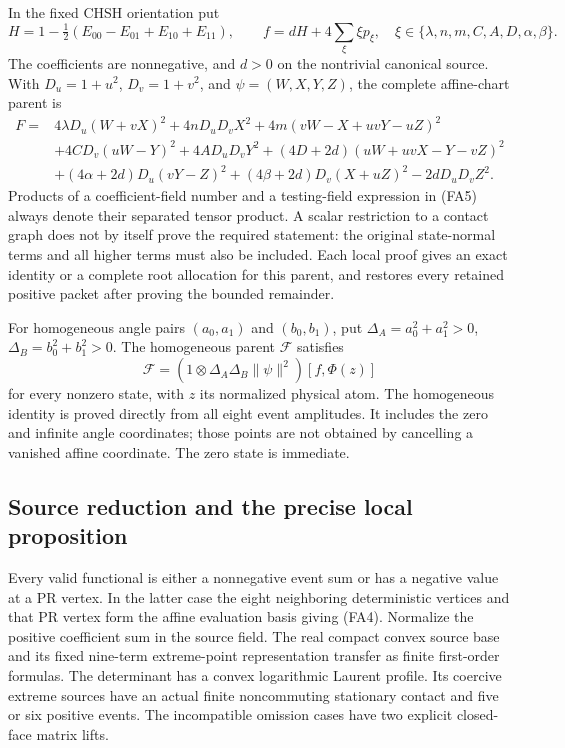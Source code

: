In the fixed CHSH orientation put
\[
 H=1-\tfrac12(E_{00}-E_{01}+E_{10}+E_{11}),\qquad
 f=dH+4\sum_{\xi}\xi p_\xi,
 \quad\xi\in\{\lambda,n,m,C,A,D,\alpha,\beta\}.                \tag{FA4}
\]
The coefficients are nonnegative, and $d>0$ on the nontrivial
canonical source.  With $D_u=1+u^2$, $D_v=1+v^2$, and
$\psi=(W,X,Y,Z)$, the complete affine-chart parent is
\begin{align*}
 F={}&4\lambda D_u(W+vX)^2+4nD_uD_vX^2
       +4m(vW-X+uvY-uZ)^2\\
   &+4CD_v(uW-Y)^2+4AD_uD_vY^2
       +(4D+2d)(uW+uvX-Y-vZ)^2\\
   &+(4\alpha+2d)D_u(vY-Z)^2
       +(4\beta+2d)D_v(X+uZ)^2-2dD_uD_vZ^2.          \tag{FA5}
\end{align*}
Products of a coefficient-field number and a testing-field expression
in (FA5) always denote their separated tensor product.  A scalar
restriction to a contact graph does not by itself prove the required
statement: the original state-normal terms and all higher terms must
also be included.  Each local proof gives an exact identity or a
complete root allocation for this parent, and restores every retained
positive packet after proving the bounded remainder.

For homogeneous angle pairs $(a_0,a_1)$ and $(b_0,b_1)$, put
$\Delta_A=a_0^2+a_1^2>0$, $\Delta_B=b_0^2+b_1^2>0$.
The homogeneous parent $\mathcal F$ satisfies
\[
 \mathcal F=(1\otimes\Delta_A\Delta_B\|\psi\|^2)
                  [f,\Phi(z)]                              \tag{FA6}
\]
for every nonzero state, with $z$ its normalized physical atom.
The homogeneous identity is proved directly from all eight event
amplitudes.  It includes the zero and infinite angle coordinates;
those points are not obtained by cancelling a vanished affine
coordinate.  The zero state is immediate.

\subsection*{Source reduction and the precise local proposition}

Every valid functional is either a nonnegative event sum or has a
negative value at a PR vertex.  In the latter case the eight neighboring
deterministic vertices and that PR vertex form the affine evaluation
basis giving (FA4).  Normalize the positive coefficient sum in the
source field.  The real compact convex source base and its fixed
nine-term extreme-point representation transfer as finite first-order
formulas.  The determinant has a convex logarithmic Laurent profile.
Its coercive extreme sources have an actual finite noncommuting
stationary contact and five or six positive events.  The incompatible
omission cases have two explicit closed-face matrix lifts.

